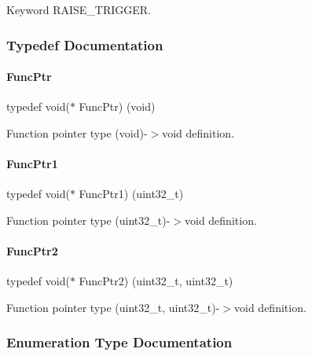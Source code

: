 Keyword R\+A\+I\+S\+E\+\_\+\+T\+R\+I\+G\+G\+ER. 

\subsubsection{Typedef Documentation}
\mbox{\label{a00020_a3d987633d7a3ca10c14905a807b62eb1}} 
\paragraph{\texorpdfstring{Func\+Ptr}{FuncPtr}}
{\footnotesize\ttfamily typedef void($\ast$ Func\+Ptr) (void)}

Function pointer type (void)-\/$>$void definition. \mbox{\label{a00020_a0891965816a5b721b07f7bebefaf7430}} 
\paragraph{\texorpdfstring{Func\+Ptr1}{FuncPtr1}}
{\footnotesize\ttfamily typedef void($\ast$ Func\+Ptr1) (uint32\+\_\+t)}

Function pointer type (uint32\+\_\+t)-\/$>$void definition. \mbox{\label{a00020_a331a88eeefe11112bb8fe1b43dd777b8}} 
\paragraph{\texorpdfstring{Func\+Ptr2}{FuncPtr2}}
{\footnotesize\ttfamily typedef void($\ast$ Func\+Ptr2) (uint32\+\_\+t, uint32\+\_\+t)}

Function pointer type (uint32\+\_\+t, uint32\+\_\+t)-\/$>$void definition. 

\subsubsection{Enumeration Type Documentation}
\mbox{\label{a00020_a4ecccde27f29cedbe9bc6a22e3aad16f}} 

